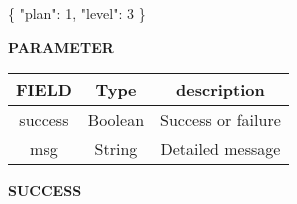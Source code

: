 \documentclass[
]{article}
\newenvironment{Shaded}{}{}
\newcommand{\DataTypeTok}[1]{\textcolor[rgb]{0.56,0.13,0.00}{#1}}
\newcommand{\DecValTok}[1]{\textcolor[rgb]{0.25,0.63,0.44}{#1}}
\newcommand{\FunctionTok}[1]{\textcolor[rgb]{0.02,0.16,0.49}{#1}}
\begin{document}
\begin{Shaded}
\begin{Highlighting}[]
\FunctionTok{\{}
	\DataTypeTok{"plan"}\FunctionTok{:} \DecValTok{1}\FunctionTok{,}
	\DataTypeTok{"level"}\FunctionTok{:} \DecValTok{3}
\FunctionTok{\}}
\end{Highlighting}
\end{Shaded}

\textbf{PARAMETER}

\begin{longtable}[]{@{}ccc@{}}
\toprule
FIELD & Type & description\tabularnewline
\midrule
\endhead
success & Boolean & Success or failure\tabularnewline
msg & String & Detailed message\tabularnewline
\bottomrule
\end{longtable}

\textbf{SUCCESS}
\end{document}
